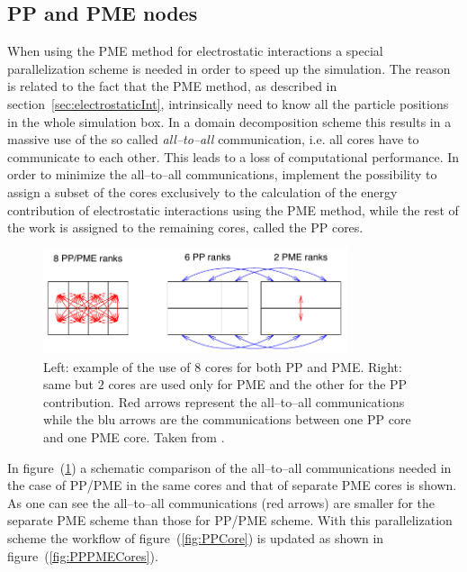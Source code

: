 \subsection{PP and PME nodes}
When using the \ac{PME} method for electrostatic interactions a special parallelization scheme is needed in order 
to speed up the simulation. The reason is related to the fact that the \ac{PME} method, as described in 
section~\ref{sec:electrostaticInt}, intrinsically need to know all the particle positions in the whole simulation 
box. In a domain decomposition scheme this results in a massive use of the so called \textit{all--to--all} 
communication, i.e. all cores have to communicate to each other. This leads to a loss of computational 
performance. In order to minimize the all--to--all communications, \gromacs{} implement the possibility to assign 
a subset of the cores exclusively to the calculation of the energy contribution of electrostatic interactions 
using the \ac{PME} method, while the rest of the work is assigned to the remaining cores, called the \ac{PP} 
cores. 
\begin{figure}[h!t]
	\centering
	\includegraphics[width=0.8\textwidth]{./img/PMENodes}
	\caption{Left: example of the use of $8$ cores for both \acs{PP} and \acs{PME}. Right: same but $2$ cores are used only for \acs{PME} and the other for the \acs{PP} contribution. Red arrows represent the all--to--all communications while the blu arrows are the communications between one \acs{PP} core and one \acs{PME} core. Taken from \cite{gromacsManual}.}%
	\label{fig:PMENodes}
\end{figure} 
In figure~(\ref{fig:PMENodes}) a schematic comparison of the all--to--all communications needed in the case of 
\ac{PP}/\ac{PME} in the same cores and that of separate \ac{PME} cores is shown. As one can see the 
all--to--all communications (red arrows) are smaller for the separate \acs{PME} scheme than those for 
\ac{PP}/\ac{PME} scheme. With this parallelization scheme the workflow of figure~(\ref{fig:PPCore}) is updated as 
shown in figure~(\ref{fig:PPPMECores}). 
